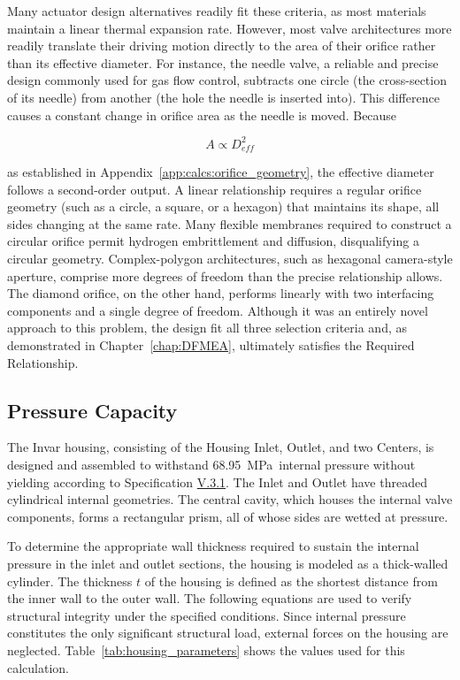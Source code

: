 \documentclass[12pt, letterpaper]{report}%
\newcounter{mycounter}           %
\newcounter{sub}[mycounter]      %
\newcommand{\specPressure}{\SI{68.95}{\mega \pascal}}%
\newcommand{\specref}[1]{\hyperref[tab:specs]{#1}}
\begin{document}
			Many actuator design alternatives readily fit these criteria, as most materials maintain a linear thermal expansion rate.
			However, most valve architectures more readily translate their driving motion directly to the area of their orifice rather than its effective diameter.
			For instance, the needle valve, a reliable and precise design commonly used for gas flow control, subtracts one circle (the cross-section of its needle) from another (the hole the needle is inserted into).
			This difference causes a constant change in orifice area as the needle is moved.
			Because

			\begin{equation*}
				A \propto D_{eff}^2
			\end{equation*}

			as established in Appendix~\ref{app:calcs:orifice_geometry}, the effective diameter follows a second-order output.
			A linear relationship requires a regular orifice geometry (such as a circle, a square, or a hexagon) that maintains its shape, all sides changing at the same rate.
			Many flexible membranes required to construct a circular orifice permit hydrogen embrittlement and diffusion, disqualifying a circular geometry.
			Complex-polygon architectures, such as hexagonal camera-style aperture, comprise more degrees of freedom than the precise relationship allows.
			The diamond orifice, on the other hand, performs linearly with two interfacing components and a single degree of freedom.
			Although it was an entirely novel approach to this problem, the design fit all three selection criteria and, as demonstrated in Chapter~\ref{chap:DFMEA}, ultimately satisfies the Required Relationship.

		\subsection{Pressure Capacity}
		\label{subsec:design:just:P}

			The Invar housing, consisting of the Housing Inlet, Outlet, and two Centers, is designed and assembled to withstand \specPressure\ internal pressure without yielding according to Specification \specref{V.3.1}. 
			The Inlet and Outlet have threaded cylindrical internal geometries.
			The central cavity, which houses the internal valve components, forms a rectangular prism, all of whose sides are wetted at pressure.

			To determine the appropriate wall thickness required to sustain the internal pressure in the inlet and outlet sections, the housing is modeled as a thick-walled cylinder.
			The thickness $t$ of the housing is defined as the shortest distance from the inner wall to the outer wall.
			The following equations are used to verify structural integrity under the specified conditions.
			Since internal pressure constitutes the only significant structural load, external forces on the housing are neglected.
			Table~\ref{tab:housing_parameters} shows the values used for this calculation.
\end{document}
